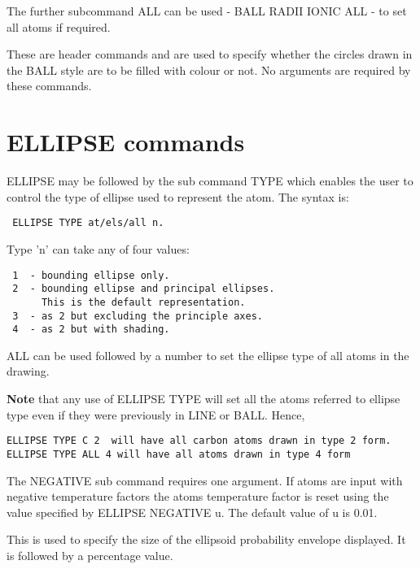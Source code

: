 \documentclass[10pt,a4paper]{report}
\begin{document}
The further subcommand ALL
can be used - BALL RADII IONIC ALL - to set all atoms if required.


\bigskip{}


\bigskip{}
These are header commands and are used to specify whether the
circles
drawn in the BALL style are to be filled with colour or not. No
arguments are required by these commands.
\section{ELLIPSE commands}


\bigskip{}


ELLIPSE may be followed by the sub command TYPE which enables
the user
to control the type of ellipse used to represent the atom.
The syntax is:
\small\begin{verbatim}
 ELLIPSE TYPE at/els/all n.
\end{verbatim}\normalsize


Type 'n' can take any of four values:
\small\begin{verbatim}
 1  - bounding ellipse only.
 2  - bounding ellipse and principal ellipses.
      This is the default representation.
 3  - as 2 but excluding the principle axes.
 4  - as 2 but with shading.
\end{verbatim}\normalsize




\bigskip{}
ALL can be used followed by a number to set the ellipse type of all 
atoms in the drawing. 


{\bf Note} that any use of ELLIPSE TYPE will set all the
atoms referred to ellipse type even if they were previously in LINE 
or BALL.
Hence,
\small\begin{verbatim}
ELLIPSE TYPE C 2  will have all carbon atoms drawn in type 2 form.
ELLIPSE TYPE ALL 4 will have all atoms drawn in type 4 form
\end{verbatim}\normalsize




\bigskip{}


The NEGATIVE sub command requires one argument. If atoms are
input
with negative temperature factors the atoms temperature factor
is reset
using the value specified by ELLIPSE NEGATIVE u. The default
value of u
is 0.01.


\bigskip{}


This is used to specify the size of the ellipsoid probability envelope
displayed. It is followed by a percentage value.
\end{document}
